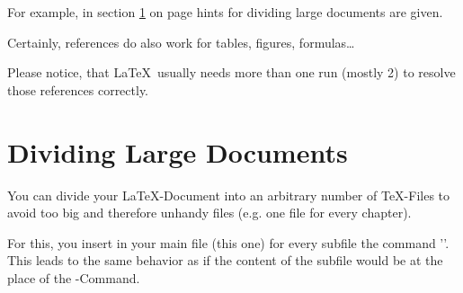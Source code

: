 \documentclass[a4paper,twoside,10pt]{report}
\begin{document}
For example, in section \ref{dividing} on page \pageref{dividing} hints for
dividing large documents are given.

Certainly, references do also work for tables, figures, formulas\ldots

Please notice, that \LaTeX\ usually needs more than one run (mostly 2) to
resolve those references correctly.


\section{Dividing Large Documents}\label{dividing}
You can divide your \LaTeX-Document into an arbitrary number of \TeX-Files
to avoid too big and therefore unhandy files (e.g. one file for every chapter).

For this, you insert in your main file (this one) for every subfile
the command '\verb##'. This leads to the same behavior
as if the content of the subfile would be at the place of the \verb##-Command.






\clearpage
{}
\listoffigures

\clearpage
{}
\listoftables


\appendix

\end{document}
